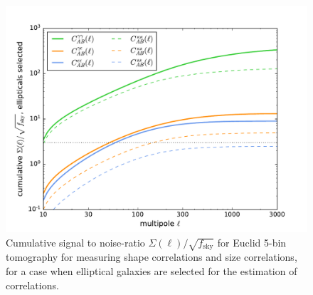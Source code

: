 \documentclass[a4paper,fleqn,usenatbib]{mnras}
\begin{document}
\begin{figure}
\centering
\includegraphics[scale=0.45]{./figures/sigma_elliptical.pdf}
\caption{Cumulative signal to noise-ratio $\Sigma(\ell)/\sqrt{f_\mathrm{sky}}$ for Euclid 5-bin tomography for measuring shape correlations and size correlations, for a case when elliptical galaxies are selected for the estimation of correlations.}
\label{fig:s2n_elliptical}
\end{figure}
\end{document}

